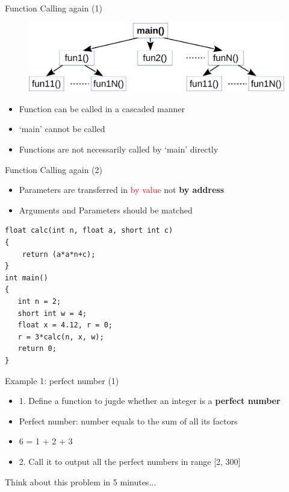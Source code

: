 \begin{frame}[fragile]{Function Calling again (1)}
\begin{figure}
	\includegraphics[width=0.8\linewidth]{figs/func_call.pdf}
\end{figure}
\begin{itemize}
	\item {Function can be called in a cascaded manner}
	\item {`main' cannot be called}
	\item {Functions are not necessarily called by `main' directly}
\end{itemize}
\end{frame}

\begin{frame}[fragile]{Function Calling again (2)}
\begin{itemize}
	\item {Parameters are transferred in \textcolor{red}{by value} not \textbf{by address}}
	\item {Arguments and Parameters should be matched}
\end{itemize}
\begin{lstlisting}
float calc(int n, float a, short int c)
{
    return (a*a*n+c);
}
int main()
{
   int n = 2;
   short int w = 4;
   float x = 4.12, r = 0;
   r = 3*calc(n, x, w);
   return 0;
}
\end{lstlisting}
\end{frame}

\begin{frame}[fragile]{Example 1: perfect number (1)}
\begin{itemize}
	\item {1. Define a function to jugde whether an integer is a \textbf{perfect number}}
	\item {Perfect number: number equals to the sum of all its factors}
	\item {6 = 1 + 2 + 3}
	\item {2. Call it to output all the perfect numbers in range [2, 300]}
\end{itemize}
\begin{center}
	\Large{Think about this problem in 5 minutes...}
\end{center}
\end{frame}

